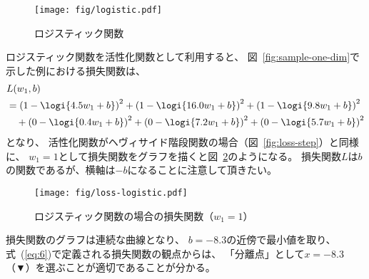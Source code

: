 \begin{figure}
  \centering
  \texttt{[image: fig/logistic.pdf]}
  \caption{ロジスティック関数}
  \label{fig:logistic}
\end{figure}

ロジスティック関数を活性化関数として利用すると、
図~\ref{fig:sample-one-dim}で示した例における損失関数は、
\begin{align}
  &\nonumber
    L(w_1, b)
  \\&\nonumber
    =
    \left(1 - \logi{4.5 w_1 + b}\right)^2 + \left(1 - \logi{16.0 w_1 + b}\right)^2 + \left(1 - \logi{9.8 w_1 + b}\right)^2
  \\&\label{eq:6}\quad
  + \left(0 - \logi{0.4 w_1 + b}\right)^2 + \left(0 - \logi{7.2 w_1 + b}\right)^2 + \left(0 - \logi{5.7 w_1 + b}\right)^2
\end{align}
となり、
活性化関数がヘヴィサイド階段関数の場合（図~\ref{fig:loss-step}）と同様に、
$w_1  = 1$として損失関数をグラフを描くと図~\ref{fig:loss-logistic}のようになる。
損失関数$L$は$b$の関数であるが、横軸は$-b$になることに注意して頂きたい。

\begin{figure}
  \centering
  \texttt{[image: fig/loss-logistic.pdf]}
  \caption{ロジスティック関数の場合の損失関数（$w_1 = 1$）}
  \label{fig:loss-logistic}
\end{figure}

損失関数のグラフは連続な曲線となり、
$b = -8.3$の近傍で最小値を取り、
式~(\ref{eq:6})で定義される損失関数の観点からは、
「分離点」として$x = -8.3$（▼）を選ぶことが適切であることが分かる。

